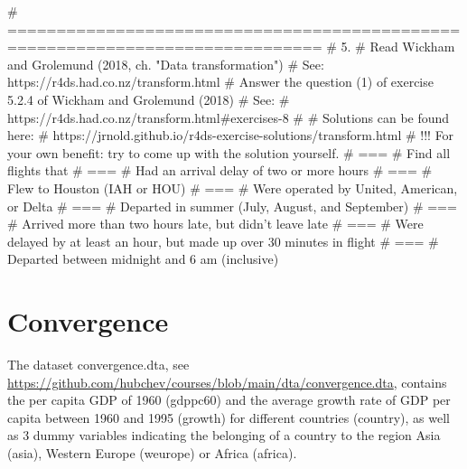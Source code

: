 \begin{rblock1}
# ==============================================================================
# 5. 
# Read Wickham and Grolemund (2018, ch. "Data transformation") 
# See: https://r4ds.had.co.nz/transform.html
# Answer the question (1) of exercise 5.2.4 of Wickham and Grolemund (2018)
# See: 
# https://r4ds.had.co.nz/transform.html#exercises-8
# 
# Solutions can be found here:
# https://jrnold.github.io/r4ds-exercise-solutions/transform.html
# !!! For your own benefit: try to come up with the solution yourself. 
# ===
# Find all flights that
# ===
# Had an arrival delay of two or more hours
# ===
# Flew to Houston (IAH or HOU)
# ===
# Were operated by United, American, or Delta
# ===
# Departed in summer (July, August, and September)
# ===
# Arrived more than two hours late, but didn’t leave late
# ===
# Were delayed by at least an hour, but made up over 30 minutes in flight
# ===
# Departed between midnight and 6 am (inclusive)
\end{rblock1}

\section{Convergence}\label{sec:convergence}

The dataset convergence.dta, see  \url{https://github.com/hubchev/courses/blob/main/dta/convergence.dta}, contains the per capita GDP of 1960 (gdppc60) and the average growth rate of GDP per capita between 1960 and 1995 (growth) for different countries (country), as well as 3 dummy variables indicating the belonging of a country to the region Asia (asia), Western Europe (weurope) or Africa (africa). 

